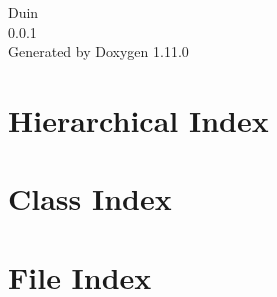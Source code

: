 \documentclass[twoside]{book}
\newcommand{\+}{\discretionary{\mbox{\scriptsize$\hookleftarrow$}}{}{}}
\newcommand{\clearemptydoublepage}{%
    \newpage{\pagestyle{empty}\cleardoublepage}%
  }
\begin{document}
  \raggedbottom
    \hypersetup{pageanchor=false,
                bookmarksnumbered=true,
                pdfencoding=unicode
               }
  \begin{titlepage}
  \vspace*{7cm}
  \begin{center}%
  {\Large Duin}\\
  [1ex]\large 0.\+0.\+1 \\
  \vspace*{1cm}
  {\large Generated by Doxygen 1.11.0}\\
  \end{center}
  \end{titlepage}
  \clearemptydoublepage
  \tableofcontents
  \clearemptydoublepage
  \hypersetup{pageanchor=true}

\chapter{Hierarchical Index}

\chapter{Class Index}

\chapter{File Index}

\end{document}
